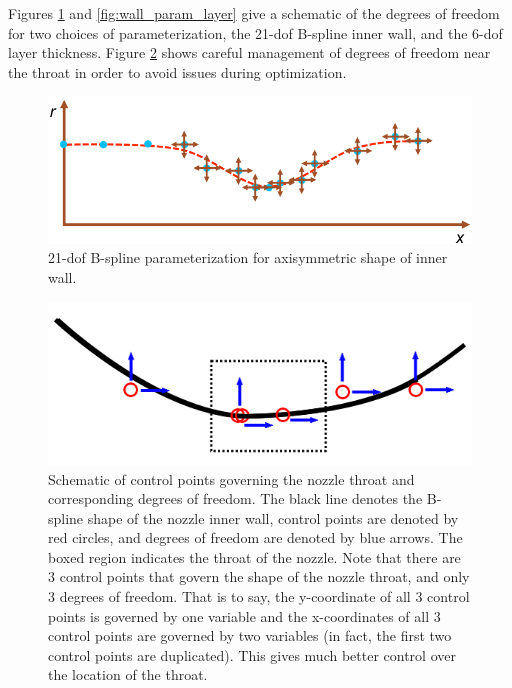 \documentclass{article}
\begin{document}
Figures \ref{fig:wall_param_bspline} and \ref{fig:wall_param_layer} give a schematic of the degrees of freedom for two choices of parameterization, the 21-dof B-spline inner wall, and the 6-dof layer thickness. Figure \ref{fig:throatDofs} shows careful management of degrees of freedom near the throat in order to avoid issues during optimization.

\begin{figure}
\caption{21-dof B-spline parameterization for axisymmetric shape of inner wall.}
\label{fig:wall_param_bspline}
\begin{center}
\includegraphics[scale=0.4]{figs/bspline_parameterization.png}
\end{center}
\end{figure}

\begin{figure}
\caption{Schematic of control points governing the nozzle throat and corresponding degrees of freedom. The black line denotes the B-spline shape of the nozzle inner wall, control points are denoted by red circles, and degrees of freedom are denoted by blue arrows. The boxed region indicates the throat of the nozzle. Note that there are 3 control points that govern the shape of the nozzle throat, and only 3 degrees of freedom. That is to say, the y-coordinate of all 3 control points is governed by one variable and the x-coordinates of all 3 control points are governed by two variables (in fact, the first two control points are duplicated). This gives much better control over the location of the throat.}
\label{fig:throatDofs}
\begin{center}
\includegraphics[scale=0.5]{figs/throat_area_control_points.png}
\end{center}
\end{figure}
\end{document}
